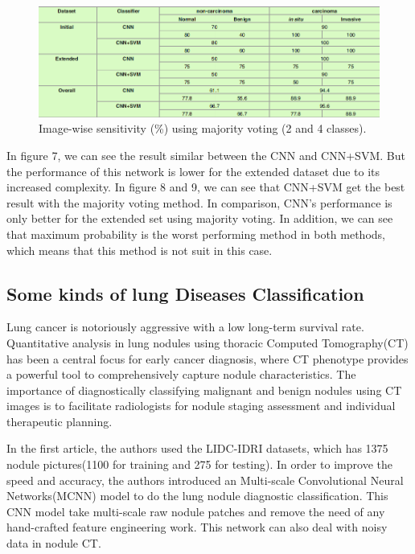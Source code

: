 \documentclass[10pt,twocolumn,letterpaper]{article}
\begin{document}
\begin{figure}[t]
	\begin{center}
		\includegraphics[width=0.8\linewidth]{Pic/14.png}
	\end{center}
	\caption{Image-wise sensitivity (\%) using majority voting (2 and 4 classes).}
	\label{fig:long}
	\label{fig:onecol}
\end{figure}

In figure 7, we can see the result similar between the CNN and CNN+SVM. But the performance of this network is lower for the extended dataset due to its increased complexity. In figure 8 and 9, we can see that CNN+SVM get the best result with the majority voting method. In comparison, CNN's performance is only better for the extended set using majority voting. In addition, we can see that maximum probability is the worst performing method in both methods, which means that this method is not suit in this case.

\subsection{Some kinds of lung Diseases Classification}

Lung cancer is notoriously aggressive with a low long-term survival rate. Quantitative analysis in lung nodules using thoracic Computed Tomography(CT) has been a central focus for early cancer diagnosis, where CT phenotype provides a powerful tool to comprehensively capture nodule characteristics. The importance of diagnostically classifying malignant and benign nodules using CT images is to facilitate radiologists for nodule staging assessment and individual therapeutic planning.\cite{shen2015multi}

In the first article\cite{shen2015multi}, the authors used the LIDC-IDRI datasets, which has 1375 nodule pictures(1100 for training and 275 for testing). In order to improve the speed and accuracy, the authors introduced an Multi-scale Convolutional Neural Networks(MCNN) model to do the lung nodule diagnostic classification. This CNN model take multi-scale raw nodule patches and remove the need of any hand-crafted feature engineering work. This network can also deal with noisy data in nodule CT.
\end{document}
